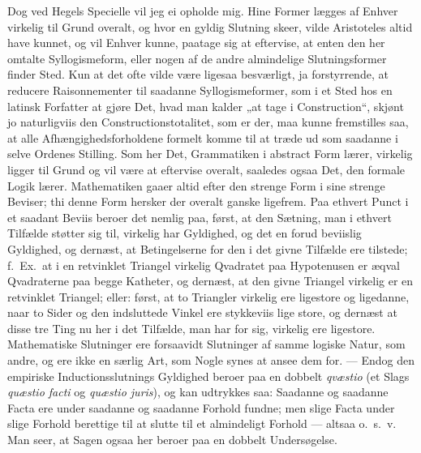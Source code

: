 \documentclass[12pt,a4paper]{book}
\newcommand{\apage}[1]{\marginnote{\footnotesize\textit{[#1]}}}
\begin{document}
Dog ved Hegels Specielle vil jeg ei opholde mig. Hine Former lægges af
Enhver virkelig til Grund overalt, og hvor en gyldig Slutning skeer, vilde
Aristoteles altid have kunnet, og vil Enhver kunne, paatage sig at
eftervise, at enten den her omtalte Syllogismeform, eller nogen af de andre
almindelige Slutningsformer finder Sted. Kun at det ofte vilde være
ligesaa besværligt, ja forstyrrende, at reducere Raisonnementer til
saadanne Syllogismeformer, som i et Sted hos en latinsk Forfatter at gjøre
Det, hvad man kalder „at tage i Construction“, skjønt jo naturligviis den
Constructionstotalitet, som er der, maa kunne fremstilles saa, at alle
Afhængighedsforholdene formelt komme til at træde ud som saadanne i selve
Ordenes Stilling. Som her Det, Grammatiken i abstract Form lærer, virkelig
ligger til Grund og vil være at eftervise overalt, saaledes ogsaa Det, den
formale Logik lærer. Mathematiken gaaer altid efter den strenge Form i sine
strenge Beviser; thi denne Form hersker der overalt ganske ligefrem. Paa
ethvert Punct i et saadant Beviis beroer det nemlig paa, først, at den
Sætning, man i ethvert Tilfælde støtter sig til, virkelig har Gyldighed, og
det en forud beviislig Gyldighed, og dernæst, at Betingelserne for den i
det givne Tilfælde ere tilstede; f.\ Ex.\ at i en retvinklet Triangel
virkelig Qvadratet paa Hypotenusen er æqval Qvadraterne paa begge Katheter,
og dernæst, at den givne Triangel virkelig er en retvinklet Triangel;
\apage{90} eller: først, at to Triangler virkelig ere ligestore og ligedanne, naar to
Sider og den indsluttede Vinkel ere stykkeviis lige store, og dernæst at
disse tre Ting nu her i det Tilfælde, man har for sig, virkelig ere
ligestore. Mathematiske Slutninger ere forsaavidt Slutninger af samme
logiske Natur, som andre, og ere ikke en særlig Art, som Nogle synes at
ansee dem for. --- Endog den empiriske Inductionsslutnings Gyldighed beroer
paa en dobbelt \textit{qvæstio} (et Slags \textit{quæstio facti} og
\textit{quæstio juris}), og kan udtrykkes saa: Saadanne og saadanne Facta
ere under saadanne og saadanne Forhold fundne; men slige Facta under slige
Forhold berettige til at slutte til et almindeligt Forhold --- altsaa
o.\ s.\ v. Man seer, at Sagen ogsaa her beroer paa en dobbelt Undersøgelse.
\end{document}
